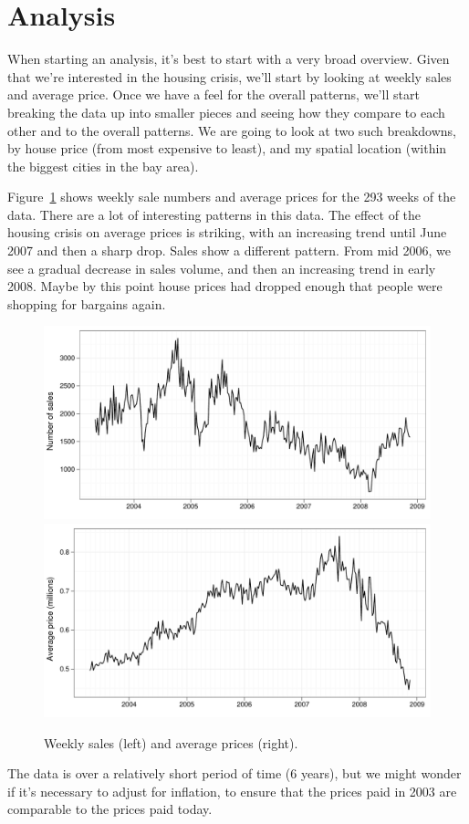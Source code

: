 \documentclass[oneside]{article}
\begin{document}
\section{Analysis}

When starting an analysis, it's best to start with a very broad overview.  Given that we're interested in the housing crisis, we'll start by looking at weekly sales and average price.  Once we have a feel for the overall patterns, we'll start breaking the data up into smaller pieces and seeing how they compare to each other and to the overall patterns.  We are going to look at two such breakdowns, by house price (from most expensive to least), and my spatial location (within the biggest cities in the bay area).

Figure~\ref{fig:daily} shows weekly sale numbers and average prices for the 293 weeks of the data.  There are a lot of interesting patterns in this data.  The effect of the housing crisis on average prices is striking, with an increasing trend until June 2007 and then a sharp drop.  Sales show a different pattern.  From mid 2006, we see a gradual decrease in sales volume, and then an increasing trend in early 2008.  Maybe by this point house prices had dropped enough that people were shopping for bargains again.

\begin{figure}[htbp]
  \centering
    \includegraphics[width=0.5 \linewidth]{daily-sales}%
    \includegraphics[width=0.5 \linewidth]{daily-price}%
  \caption{Weekly sales (left) and average prices (right).}
  \label{fig:daily}
\end{figure}

The data is over a relatively short period of time (6 years), but we might wonder if it's necessary to adjust for inflation, to ensure that the prices paid in 2003 are comparable to the prices paid today.
\end{document}
